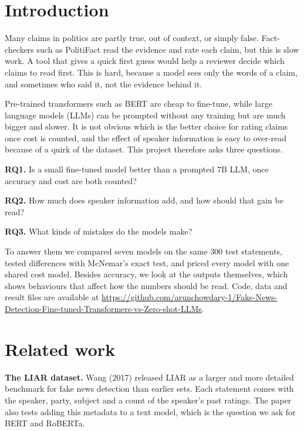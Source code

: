 \documentclass[10pt,a4paper,twoside]{article}
\begin{document}
\section{Introduction}

Many claims in politics are partly true, out of context, or simply false. Fact-checkers such as PolitiFact read the evidence and rate each claim, but this is slow work. A tool that gives a quick first guess would help a reviewer decide which claims to read first. This is hard, because a model sees only the words of a claim, and sometimes who said it, not the evidence behind it.

Pre-trained transformers such as BERT are cheap to fine-tune, while large language models (LLMs) can be prompted without any training but are much bigger and slower. It is not obvious which is the better choice for rating claims once cost is counted, and the effect of speaker information is easy to over-read because of a quirk of the dataset. This project therefore asks three questions.

\textbf{RQ1.} Is a small fine-tuned model better than a prompted 7B LLM, once accuracy and cost are both counted?

\textbf{RQ2.} How much does speaker information add, and how should that gain be read?

\textbf{RQ3.} What kinds of mistakes do the models make?

To answer them we compared seven models on the same 300 test statements, tested differences with McNemar's exact test, and priced every model with one shared cost model. Besides accuracy, we look at the outputs themselves, which shows behaviours that affect how the numbers should be read. Code, data and result files are available at \url{https://github.com/arunchowdary-1/Fake-News-Detection-Fine-tuned-Transformers-vs-Zero-shot-LLMs}.

\section{Related work}

\textbf{The LIAR dataset.} Wang (2017) released LIAR as a larger and more detailed benchmark for fake news detection than earlier sets. Each statement comes with the speaker, party, subject and a count of the speaker's past ratings. The paper also tests adding this metadata to a text model, which is the question we ask for BERT and RoBERTa.
\end{document}
